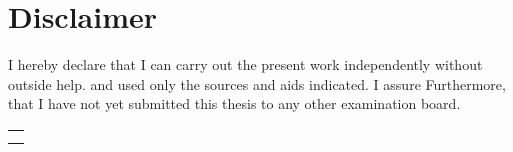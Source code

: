 
\thispagestyle{empty}
\section*{Disclaimer}
I hereby declare that I can carry out the present work independently without outside help.
and used only the sources and aids indicated. I assure
Furthermore, that I have not yet submitted this thesis to any other examination board.



\vspace{5em}

\begin{flushleft}
	\begin{tabular}{l}
		\hline \\
		\author, \location, den \date
	\end{tabular}
\end{flushleft}